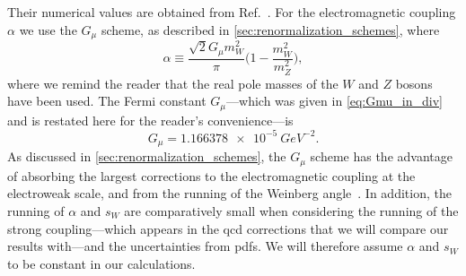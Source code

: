 Their numerical values are obtained from Ref.~\cite{ParticleDataGroup:2026aaa}.
For the electromagnetic coupling $\alpha$ we use the $G_\mu$ scheme, as described in \cref{sec:renormalization_schemes}, where
\begin{equation}
    \alpha \equiv \frac{\sqrt{2}G_\mu m_W^2}{\pi} \biggl(1-\frac{m_W^2}{m_Z^2}\biggr),
\end{equation}
where we remind the reader that the real pole masses of the $W$ and $Z$ bosons have been used.
The Fermi constant $G_\mu$---which was given in \cref{eq:Gmu_in_div} and is restated here for the reader's convenience---is~\cite{ParticleDataGroup:2026aaa}
\begin{equation}
    G_\mu = \qty{1.166 378e-5}{GeV^{-2}}.
\end{equation}
As discussed in \cref{sec:renormalization_schemes}, the $G_\mu$ scheme has the advantage of absorbing the largest corrections to the electromagnetic coupling at the electroweak scale, and from the running of the Weinberg angle~\cite{Denner:2019vbn}.
In addition, the running of $\alpha$ and $s_W$ are comparatively small when considering the running of the strong coupling---which appears in the \gls{qcd} corrections that we will compare our results with---and the uncertainties from \glspl{pdf}. We will therefore assume $\alpha$ and $s_W$ to be constant in our calculations.

